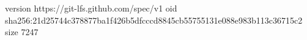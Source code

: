 version https://git-lfs.github.com/spec/v1
oid sha256:21d25744c378877ba1f426b5dfcccd8845cb55755131e088e983b113c36715c2
size 7247
